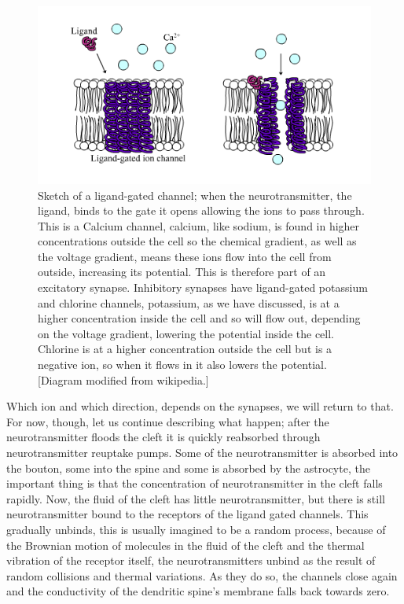 \documentclass{article}
\begin{document}
\begin{figure}
\begin{center}
\includegraphics[width=12cm]{LGIC.png}
\end{center}
\caption{Sketch of a ligand-gated channel; when the neurotransmitter,
  the ligand, binds to the gate it opens allowing the ions to pass
  through. This is a Calcium channel, calcium, like sodium, is found
  in higher concentrations outside the cell so the chemical gradient,
  as well as the voltage gradient, means these ions flow into the cell
  from outside, increasing its potential.  This is therefore part of
  an excitatory synapse. Inhibitory synapses have ligand-gated
  potassium and chlorine channels, potassium, as we have discussed, is
  at a higher concentration inside the cell and so will flow out,
  depending on the voltage gradient, lowering the potential inside the
  cell. Chlorine is at a higher concentration outside the cell but is
  a negative ion, so when it flows in it also lowers the
  potential. [Diagram modified from wikipedia.]\label{LGIC}}
\end{figure}

Which ion and which direction, depends on the synapses, we will return
to that. For now, though, let us continue describing what happen;
after the neurotransmitter floods the cleft it is quickly reabsorbed
through neurotransmitter reuptake pumps. Some of the neurotransmitter
is absorbed into the bouton, some into the spine and some is absorbed
by the astrocyte, the important thing is that the concentration of
neurotransmitter in the cleft falls rapidly. Now, the fluid of the
cleft has little neurotransmitter, but there is still neurotransmitter
bound to the receptors of the ligand gated channels. This gradually
unbinds, this is usually imagined to be a random process, because of
the Brownian motion of molecules in the fluid of the cleft and the
thermal vibration of the receptor itself, the neurotransmitters unbind
as the result of random collisions and thermal variations. As they do
so, the channels close again and the conductivity of the dendritic
spine's membrane falls back towards zero.
\end{document}
